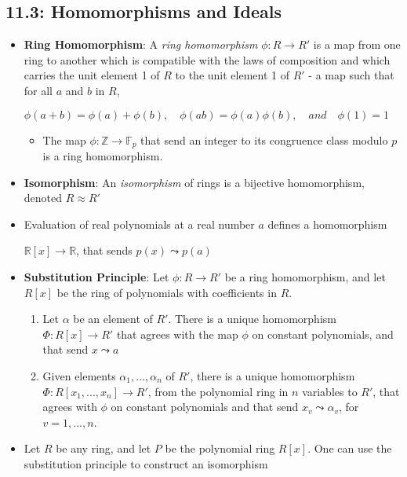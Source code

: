 \documentclass[12pt]{article}
\begin{document}
\subsection*{11.3: Homomorphisms and Ideals}
\begin{itemize}
  \item \textbf{Ring Homomorphism}: A \textit{ring homomorphism} $\phi: R \to R'$ is a map from one ring to another which is compatible with the laws of composition and which carries the unit element 1 of $R$ to the unit element 1 of $R'$ - a map such that for all $a$ and $b$ in $R$,
  \begin{center}
    $\phi(a + b) = \phi(a) + \phi(b), \quad \phi(ab) = \phi(a)\phi(b), \quad and \quad \phi(1) = 1$
  \end{center}
  \begin{itemize}
    \item The map $\phi: \mathbb{Z} \to \mathbb{F}_p$ that send an integer to its congruence class modulo $p$ is a ring homomorphism.
  \end{itemize}
  \item \textbf{Isomorphism}: An \textit{isomorphism} of rings is a bijective homomorphism, denoted $R \approx R'$
  \item Evaluation of real polynomials at a real number $a$ defines a homomorphism
  \begin{center}
    $\mathbb{R}[x] \to \mathbb{R}$, \quad that sends \quad $p(x) \leadsto p(a)$
  \end{center}
  \item \textbf{Substitution Principle}: Let $\phi: R \to R'$ be a ring homomorphism, and let $R[x]$ be the ring of polynomials with coefficients in $R$.
  \begin{enumerate}
    \begin{enumerate}
      \item Let $\alpha$ be an element of $R'$. There is a unique homomorphism $\Phi: R[x] \to R'$ that agrees with the map $\phi$ on constant polynomials, and that send $x \leadsto a$
      \item Given elements $\alpha_1, ..., \alpha_n$ of $R'$, there is a unique homomorphism $\Phi: R[x_1, ..., x_n] \to R'$, from the polynomial ring in $n$ variables to $R'$, that agrees with $\phi$ on constant polynomials and that send $x_v \leadsto \alpha_v$, for $v = 1, ..., n$.
    \end{enumerate}
  \end{enumerate}
  \item Let $R$ be any ring, and let $P$ be the polynomial ring $R[x]$. One can use the substitution principle to construct an isomorphism

\end{itemize}
\end{document}
